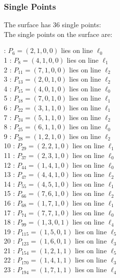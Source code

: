 \documentclass{article}
\begin{document}
{\subsubsection*{Single Points}
The surface has 36 single points:\\
The single points on the surface are:\\
\begin{multicols}{2}
 : $P_{6}=( 2, 1, 0, 0 )$ lies on line $\ell_{0}$\\
1 : $P_{8}=( 4, 1, 0, 0 )$ lies on line $\ell_{1}$\\
2 : $P_{11}=( 7, 1, 0, 0 )$ lies on line $\ell_{2}$\\
3 : $P_{13}=( 2, 0, 1, 0 )$ lies on line $\ell_{2}$\\
4 : $P_{15}=( 4, 0, 1, 0 )$ lies on line $\ell_{0}$\\
5 : $P_{18}=( 7, 0, 1, 0 )$ lies on line $\ell_{1}$\\
6 : $P_{22}=( 3, 1, 1, 0 )$ lies on line $\ell_{1}$\\
7 : $P_{24}=( 5, 1, 1, 0 )$ lies on line $\ell_{2}$\\
8 : $P_{25}=( 6, 1, 1, 0 )$ lies on line $\ell_{0}$\\
9 : $P_{28}=( 1, 2, 1, 0 )$ lies on line $\ell_{2}$\\
10 : $P_{29}=( 2, 2, 1, 0 )$ lies on line $\ell_{1}$\\
11 : $P_{37}=( 2, 3, 1, 0 )$ lies on line $\ell_{0}$\\
12 : $P_{44}=( 1, 4, 1, 0 )$ lies on line $\ell_{0}$\\
13 : $P_{47}=( 4, 4, 1, 0 )$ lies on line $\ell_{2}$\\
14 : $P_{55}=( 4, 5, 1, 0 )$ lies on line $\ell_{1}$\\
15 : $P_{66}=( 7, 6, 1, 0 )$ lies on line $\ell_{2}$\\
16 : $P_{68}=( 1, 7, 1, 0 )$ lies on line $\ell_{1}$\\
17 : $P_{74}=( 7, 7, 1, 0 )$ lies on line $\ell_{0}$\\
18 : $P_{99}=( 1, 3, 0, 1 )$ lies on line $\ell_{4}$\\
19 : $P_{115}=( 1, 5, 0, 1 )$ lies on line $\ell_{5}$\\
20 : $P_{123}=( 1, 6, 0, 1 )$ lies on line $\ell_{3}$\\
21 : $P_{154}=( 1, 2, 1, 1 )$ lies on line $\ell_{5}$\\
22 : $P_{170}=( 1, 4, 1, 1 )$ lies on line $\ell_{3}$\\
23 : $P_{194}=( 1, 7, 1, 1 )$ lies on line $\ell_{4}$\\

\end{multicols}}
\end{document}
